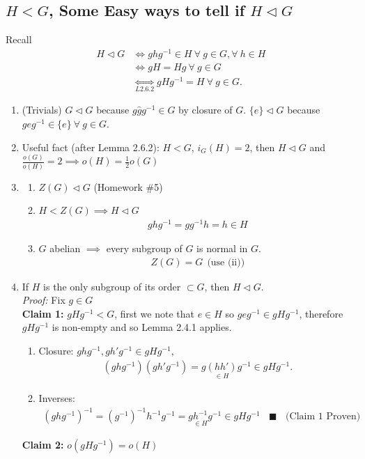 \subsection*{$H<G$, Some Easy ways to tell if $H\triangleleft G$}
\label{subsec:EasyWaysNormalSubgroup}
Recall
\begin{align}
    H\triangleleft G &\iff ghg^{-1}\in H \ \forall \ g\in G, \forall \ h\in H \nonumber \\
                     &\iff gH=Hg \ \forall \ g\in G \nonumber \\
                     &\underset{L 2.6.2}{\iff} gHg^{-1}=H \ \forall \ g\in G. \nonumber
\end{align}
\begin{enumerate}
    \item (Trivials) $G\triangleleft G$ because $g\hat{g}g^{-1}\in G$ by closure of $G$.
    $\{e\}\triangleleft G$ because $geg^{-1} \in \{e\} \ \forall \ g\in G$.
    \item Useful fact (after Lemma 2.6.2): $H<G$, $i_G(H)=2$, then $H\triangleleft G$ and
    $\frac{o(G)}{o(H)}=2\implies o(H)=\frac{1}{2}o(G)$
    \item \begin{enumerate}[label=\roman*)]
        \item $Z(G)\triangleleft G$ (Homework \#5)
        \item $H<Z(G) \implies H\triangleleft G$
        \begin{align}
            ghg^{-1}=gg^{-1}h=h\in H \nonumber
        \end{align}
        \item $G$ abelian $\implies $ every subgroup of $G$ is normal in $G$.\\
        \begin{align}
            Z(G)=G \ \ \text{(use (ii))}\nonumber
        \end{align}
    \end{enumerate}
    \item If $H$ is the only subgroup of its order $\subset G$, then $H\triangleleft G$.\\
    \textit{Proof:} Fix $g\in G$\\
    \textbf{Claim 1:} $gHg^{-1}< G$, first we note that $e\in H$ so $geg^{-1}\in gHg^{-1}$,
    therefore $gHg^{-1}$ is non-empty and so Lemma 2.4.1 applies.
    \begin{enumerate}
        \item Closure: $ghg^{-1},gh'g^{-1} \in gHg^{-1}$, \\
        \begin{align}
            (ghg^{-1})(gh'g^{-1})=g \underset{\in H}{(hh')}g^{-1} \in gHg^{-1}.\nonumber
        \end{align}
        \item Inverses:
        \begin{align}
            (ghg^{-1})^{-1}=(g^{-1})^{-1}h^{-1}g^{-1}=g\underset{\in H}{h^{-1}}g^{-1} \in gHg^{-1} \ \ \ \ \blacksquare \ \ \ \ \text{(Claim 1 Proven)}\nonumber
        \end{align}
    \end{enumerate}
    \textbf{Claim 2:} $o(gHg^{-1})=o(H)$\steezybreak


\end{enumerate}
